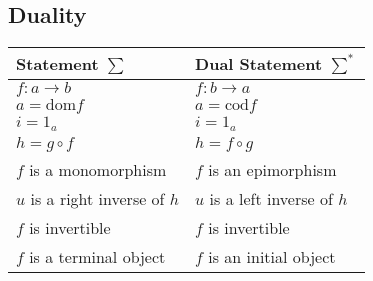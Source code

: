 \subsection{Duality}\label{duality}

\begin{center}
\begin{tabular}{ll}
Statement $\sum$ & Dual Statement $\sum^*$\\
\hline
$f: a \rightarrow b$ & $f: b \rightarrow a$\\
$a = \textrm{dom} f$ & $a = \textrm{cod} f$\\
$i=1_a$ & $i=1_a$\\
$h = g \circ f$ & $h = f \circ g$\\
$f$ is a monomorphism & $f$ is an epimorphism\\
$u$ is a right inverse of $h$ & $u$ is a left inverse of $h$\\
$f$ is invertible & $f$ is invertible\\
$f$ is a terminal object & $f$ is an initial object
\end{tabular}
\end{center}